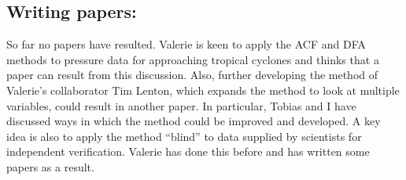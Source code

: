 \documentclass[11pt,a4paper,reqno]{article}
\numberwithin{equation}{section}
\begin{document}
\subsection*{Writing papers:}

So far no papers have resulted. Valerie is keen to apply the ACF and DFA methods to pressure data for approaching tropical cyclones and thinks that a paper can result from this discussion. Also, further developing the method of Valerie's collaborator Tim Lenton, which expands the method to look at multiple variables, could result in another paper. In particular, Tobias and I have discussed ways in which the method could be improved and developed. A key idea is also to apply the method ``blind'' to data supplied by scientists for independent verification. Valerie has done this before and has written some papers as a result.
\end{document}
